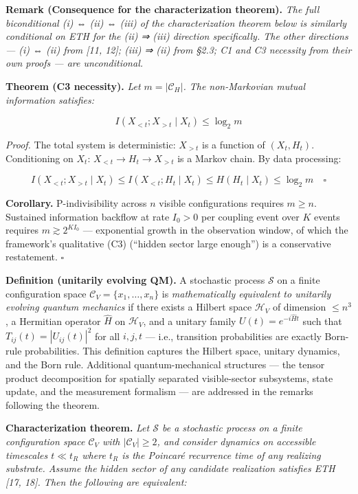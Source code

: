 \documentclass[
]{article}
\begin{document}
\textbf{Remark (Consequence for the characterization theorem).}
\emph{The full biconditional (i) ⇔ (ii) ⇔ (iii) of the characterization
theorem below is similarly conditional on ETH for the (ii) ⇒ (iii)
direction specifically. The other directions --- (i) ⇔ (ii) from {[}11,
12{]}; (iii) ⇒ (ii) from §2.3; C1 and C3 necessity from their own proofs
--- are unconditional.}

\textbf{Theorem (C3 necessity).} \emph{Let \(m = |\mathcal{C}_H|\). The
non-Markovian mutual information satisfies:}

\[I(X_{<t} ; X_{>t} \mid X_t) \leq \log_2 m\]

\emph{Proof.} The total system is deterministic: \(X_{>t}\) is a
function of \((X_t, H_t)\). Conditioning on \(X_t\):
\(X_{<t} \to H_t \to X_{>t}\) is a Markov chain. By data processing:

\[I(X_{<t} ; X_{>t} \mid X_t) \leq I(X_{<t} ; H_t \mid X_t) \leq H(H_t \mid X_t) \leq \log_2 m \quad \square\]

\textbf{Corollary.} P-indivisibility across \(n\) visible configurations
requires \(m \geq n\). Sustained information backflow at rate
\(I_0 > 0\) per coupling event over \(K\) events requires
\(m \gtrsim 2^{K I_0}\) --- exponential growth in the observation
window, of which the framework's qualitative (C3) (``hidden sector large
enough'') is a conservative restatement. \(\square\)

\textbf{Definition (unitarily evolving QM).} A stochastic process
\(\mathcal{S}\) on a finite configuration space
\(\mathcal{C}_V = \{x_1, \ldots, x_n\}\) is \emph{mathematically
equivalent to unitarily evolving quantum mechanics} if there exists a
Hilbert space \(\mathcal{H}_V\) of dimension \(\leq n^3\), a Hermitian
operator \(\hat{H}\) on \(\mathcal{H}_V\), and a unitary family
\(U(t) = e^{-i\hat{H}t}\) such that \(T_{ij}(t) = |U_{ij}(t)|^2\) for
all \(i, j, t\) --- i.e., transition probabilities are exactly Born-rule
probabilities. This definition captures the Hilbert space, unitary
dynamics, and the Born rule. Additional quantum-mechanical structures
--- the tensor product decomposition for spatially separated
visible-sector subsystems, state update, and the measurement formalism
--- are addressed in the remarks following the theorem.

\textbf{Characterization theorem.} \emph{Let \(\mathcal{S}\) be a
stochastic process on a finite configuration space \(\mathcal{C}_V\)
with \(|\mathcal{C}_V| \geq 2\), and consider dynamics on accessible
timescales \(t \ll t_R\) where \(t_R\) is the Poincaré recurrence time
of any realizing substrate. Assume the hidden sector of any candidate
realization satisfies ETH {[}17, 18{]}. Then the following are
equivalent:}
\end{document}
